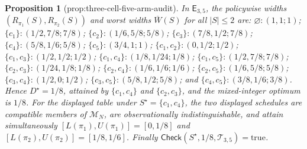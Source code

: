 \documentclass{article}
\newtheorem{proposition}{Proposition}
\begin{document}
\begin{proposition}[prop:three-cell-five-arm-audit]\label{prop:three-cell-five-arm-audit}
In \(\mathsf E_{3,5}\), the policywise widths \((R_{\pi_1}(S),R_{\pi_2}(S))\) and worst widths \(\overline W(S)\) for all \(|S|\leq2\) are: \(\varnothing:(1,1;1)\); \(\{c_1\}:(1/2,7/8;7/8)\); \(\{c_2\}:(1/6,5/8;5/8)\); \(\{c_3\}:(7/8,1/2;7/8)\); \(\{c_4\}:(5/8,1/6;5/8)\); \(\{c_5\}:(3/4,1;1)\); \(\{c_1,c_2\}:(0,1/2;1/2)\); \(\{c_1,c_3\}:(1/2,1/2;1/2)\); \(\{c_1,c_4\}:(1/8,1/24;1/8)\); \(\{c_1,c_5\}:(1/2,7/8;7/8)\); \(\{c_2,c_3\}:(1/24,1/8;1/8)\); \(\{c_2,c_4\}:(1/6,1/6;1/6)\); \(\{c_2,c_5\}:(1/6,5/8;5/8)\); \(\{c_3,c_4\}:(1/2,0;1/2)\); \(\{c_3,c_5\}:(5/8,1/2;5/8)\); and \(\{c_4,c_5\}:(3/8,1/6;3/8)\). Hence \(D^{\star}=1/8\), attained by \(\{c_1,c_4\}\) and \(\{c_2,c_3\}\), and the mixed-integer optimum is \(1/8\). For the displayed table under \(S^{\star}=\{c_1,c_4\}\), the two displayed schedules are compatible members of \(\mathcal M_N\), are observationally indistinguishable, and attain simultaneously \([L(\pi_1),U(\pi_1)]=[0,1/8]\) and \([L(\pi_2),U(\pi_2)]=[1/8,1/6]\). Finally \(\mathsf{Check}(S^{\star},1/8,\mathcal T_{3,5})=\mathrm{true}\).
\end{proposition}
\end{document}
